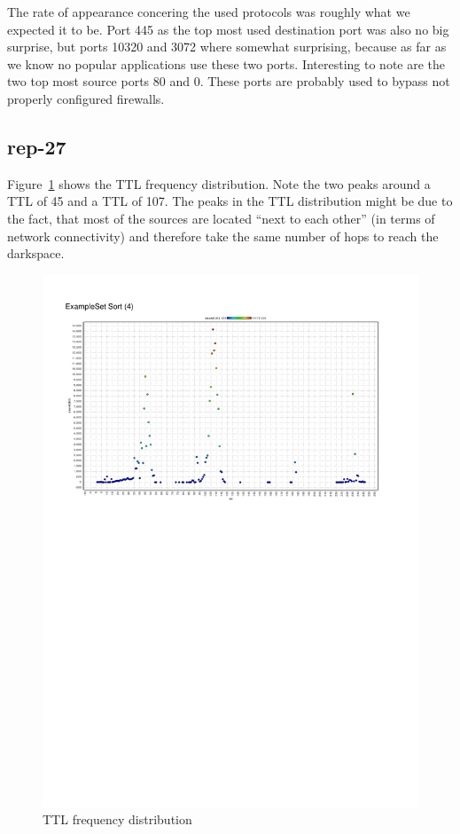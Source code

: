 \documentclass{article}
\begin{document}
The rate of appearance concering the used protocols was roughly what we expected it to be. Port
445 as the top most used destination port was also no big surprise, but ports 10320 and 3072 where
somewhat surprising, because as far as we know no popular applications use these two ports.
Interesting to note are the two top most source ports 80 and 0. These ports are probably used to
bypass not properly configured firewalls.

\subsection{rep-27}

Figure~\ref{figure:rep-27} shows the TTL frequency distribution. Note the two peaks around a
TTL of 45 and a TTL of 107.
The peaks in the TTL distribution might be due to the fact, that most of the sources are located ``next
to each other'' (in terms of network connectivity) and therefore take the same number of hops to reach the darkspace.

\begin{figure}[h]
    \centering
    \includegraphics[clip, trim=1cm 17cm 2cm 2cm, width=1.00\textwidth]{../exercise-4/ttl.pdf}
    \caption{\label{figure:rep-27} TTL frequency distribution}
\end{figure}
\end{document}
